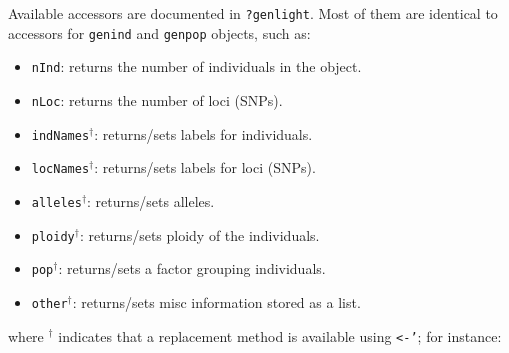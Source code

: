 \documentclass{article}
\newcommand{\code}[1]{{{\tt #1}}}
\begin{document}
Available accessors are documented in \code{?genlight}.
Most of them are identical to accessors for \texttt{genind} and \texttt{genpop} objects, such as:
\begin{itemize}
  \item \texttt{nInd}: returns the number of individuals in the object.
  \item \texttt{nLoc}: returns the number of loci (SNPs).
  \item \texttt{indNames}$^{\dagger}$: returns/sets labels for individuals.
  \item \texttt{locNames}$^{\dagger}$: returns/sets labels for loci (SNPs).
  \item \texttt{alleles}$^{\dagger}$: returns/sets alleles.
  \item \texttt{ploidy}$^{\dagger}$: returns/sets ploidy of the individuals.
  \item \texttt{pop}$^{\dagger}$: returns/sets a factor grouping individuals.
  \item \texttt{other}$^{\dagger}$: returns/sets misc information stored as a list.
\end{itemize}
where $^{\dagger}$ indicates that a replacement method is available using \texttt{<-'}; for instance:
\end{document}
